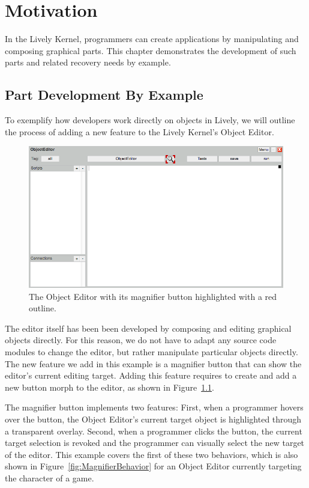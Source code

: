 \chapter{Motivation} \label{chapter:MOTIVATION}

In the Lively Kernel, programmers can create applications by manipulating and composing graphical parts.
This chapter demonstrates the development of such parts and related recovery needs by example.


\section{Part Development By Example}

To exemplify how developers work directly on objects in Lively, we will outline the process of adding a new feature to the Lively Kernel's Object Editor.

\begin{figure}[h]
    \centering
    \includegraphics[width=\textwidth]{figures/3_motivation/1_magnifierButton.png}
    \caption{The Object Editor with its magnifier button highlighted with a red outline.}
    \label{fig:MagnifierButton}
\end{figure}

The editor itself has been been developed by composing and editing graphical objects directly.
For this reason, we do not have to adapt any source code modules to change the editor, but rather manipulate particular objects directly.
The new feature we add in this example is a magnifier button that can show the editor's current editing target.
Adding this feature requires to create and add a new button morph to the editor, as shown in Figure~\ref{fig:MagnifierButton}.

The magnifier button implements two features: First, when a programmer hovers over the button, the Object Editor's current target object is highlighted through a transparent overlay. Second, when a programmer clicks the button, the current target selection is revoked and the programmer can visually select the new target of the editor.
This example covers the first of these two behaviors, which is also shown in Figure~\ref{fig:MagnifierBehavior} for an Object Editor currently targeting the character of a game.

